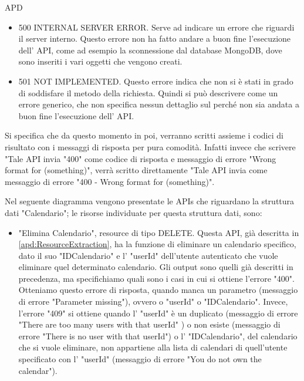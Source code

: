 \begin{listaPersonale} {APD}
\begin{listaPersonale2}[APD]{}
\begin{itemize}
            \item 500 INTERNAL SERVER ERROR. Serve ad indicare un errore che riguardi il server interno. Questo errore non ha fatto andare a buon fine l'esecuzione dell' API, come ad esempio la sconnessione dal database MongoDB, dove sono inseriti i vari oggetti che vengono creati.
            \item 501 NOT IMPLEMENTED. Questo errore indica che non si è stati in grado di soddisfare il metodo della richiesta. Quindi si può descrivere come un errore generico, che non specifica nessun dettaglio sul perché non sia andata a buon fine l'esecuzione dell' API.
        \end{itemize}
        Si specifica che da questo momento in poi, verranno scritti assieme i codici di risultato con i messaggi di risposta per pura comodità. Infatti invece che scrivere "Tale API invia "400" come codice di risposta e messaggio di errore "Wrong format for (something)", verrà scritto direttamente "Tale API invia come messaggio di errore "400 - Wrong format for (something)".
        \begin{center}
            
        \end{center}
        \newpage
        \begin{listaPersonale3}[APD]{}
            Nel seguente diagramma vengono presentate le APIs che riguardano la struttura dati "Calendario"; le risorse individuate per questa struttura dati, sono:
            \begin{itemize}
                \item "Elimina Calendario", resource di tipo DELETE. Questa API, già descritta in \ref{apd:ResourceExtraction}, ha la funzione di eliminare un calendario specifico, dato il suo "IDCalendario" e l' "userId" dell'utente autenticato che vuole eliminare quel determinato calendario. Gli output sono quelli già descritti in precedenza, ma specifichiamo quali sono i casi in cui si ottiene l'errore "400". Otteniamo questo errore di risposta, quando manca un parametro (messaggio di errore "Parameter missing"), ovvero o "userId" o "IDCalendario". Invece, l'errore "409" si ottiene quando l' "userId" è un duplicato (messaggio di errore "There are too many users with that userId" ) o non esiste (messaggio di errore "There is no user with that userId") o l' "IDCalendario", del calendario che si vuole eliminare, non appartiene alla lista di calendari di quell'utente specificato con l' "userId" (messaggio di errore "You do not own the calendar").

\end{itemize}
\end{listaPersonale3}
\end{listaPersonale2}
\end{listaPersonale}
